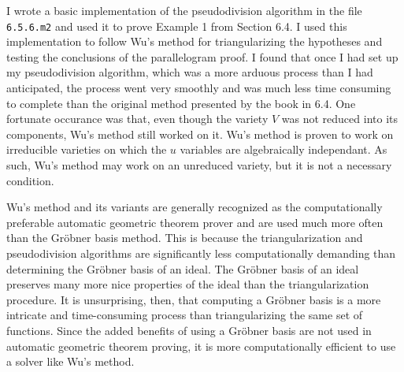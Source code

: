 \documentclass[12pt]{article}
\theoremstyle{plain}
\theoremstyle{definition}
\theoremstyle{remark}
\newcommand{\gro}{Gr\"obner }
\begin{document}
I wrote a basic implementation of the pseudodivision algorithm in the file \texttt{6.5.6.m2} and used it to prove Example 1 from Section 6.4. 
I used this implementation to follow Wu's method for triangularizing the hypotheses and testing the conclusions of the parallelogram proof.
I found that once I had set up my pseudodivision algorithm, which was a more arduous process than I had anticipated, 
the process went very smoothly and was much less time consuming to complete than the original method presented by the book in 6.4.
One fortunate occurance was that, even though the variety $V$ was not reduced into its components, Wu's method still worked on it.
Wu's method is proven to work on irreducible varieties on which the $u$ variables are algebraically independant.
As such, Wu's method may work on an unreduced variety, but it is not a necessary condition.

Wu's method and its variants are generally recognized as the computationally preferable automatic geometric theorem prover and are used much more often than the Gröbner basis method.
This is because the triangularization and pseudodivision algorithms are significantly less computationally demanding than determining the Gröbner basis of an ideal.
The \gro basis of an ideal preserves many more nice properties of the ideal than the triangularization procedure. 
It is unsurprising, then, that computing a \gro basis is a more intricate and time-consuming process than triangularizing the same set of functions.
Since the added benefits of using a \gro basis are not used in automatic geometric theorem proving, it is more computationally efficient to use a solver like Wu's method.
\end{document}
